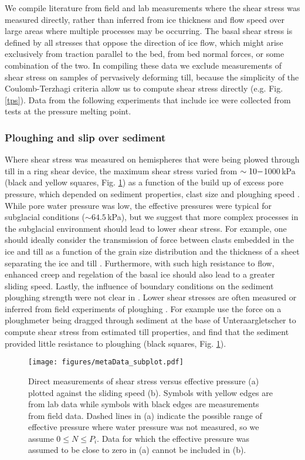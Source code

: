 \documentclass[review]{igs}
\begin{document}
We compile literature from field and lab measurements where the shear stress was measured directly, rather than inferred from ice thickness and flow speed over large areas where multiple processes may be occurring. The basal shear stress is defined by all stresses that oppose the direction of ice flow, which might arise exclusively from traction parallel to the bed, from bed normal forces, or some combination of the two. In compiling these data we exclude measurements of shear stress on samples of pervasively deforming till, because the simplicity of the Coulomb-Terzhagi criteria allow us to compute shear stress directly (e.g. Fig. \ref{tps}). Data from the following experiments that include ice were collected from tests at the pressure melting point. 

\subsubsection{Ploughing and slip over sediment}
Where shear stress was measured on hemispheres that were being plowed through till in a ring shear device, the maximum shear stress varied from $\sim 10\--$1000\,kPa (black and yellow squares, Fig. \ref{md}) as a function of the build up of excess pore pressure, which depended on sediment properties, clast size and ploughing speed \citep{Thomason2008}. While pore water pressure was low, the effective pressures were typical for subglacial conditions ($\sim 64.5$\,kPa), but we suggest that more complex processes in the subglacial environment should lead to lower shear stress. For example, one should ideally consider the transmission of force between clasts embedded in the ice and till as a function of the grain size distribution and the thickness of a sheet separating the ice and till \citep[e.g.][]{Iverson2007}. Furthermore, with such high resistance to flow, enhanced creep and regelation of the basal ice should also lead to a greater sliding speed. Lastly, the influence of boundary conditions on the sediment ploughing strength were not clear in \cite{Thomason2008}. Lower shear stresses are often measured or inferred from field experiments of ploughing \citep[e.g.][]{Fischer1994,Fischer2001,Kavanaugh2006}. For example \cite{Fischer2001} use the force on a ploughmeter being dragged through sediment at the base of Unteraargletscher to compute shear stress from estimated till properties, and find that the sediment provided little resistance to ploughing (black squares, Fig. \ref{md}). 

\begin{figure}[H]
  \centering
  \texttt{[image: figures/metaData\_subplot.pdf]}
  \caption[]{Direct measurements of shear stress versus effective pressure (a) plotted against the sliding speed (b). Symbols with yellow edges are from lab data while symbols with black edges are measurements from field data. Dashed lines in (a) indicate the possible range of effective pressure where water pressure was not measured, so we assume $0\leq N \leq P_i$. Data for which the effective pressure was assumed to be close to zero in (a) cannot be included in (b).}
\label{md}
\end{figure}
\end{document}
